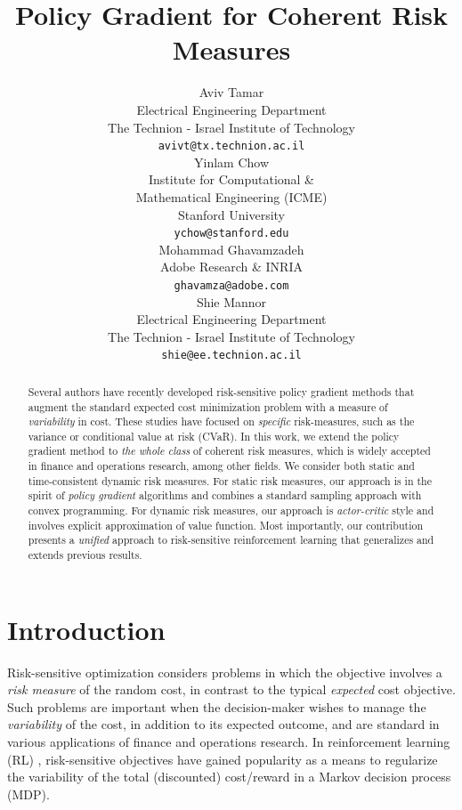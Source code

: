 \documentclass{article} %
\title{Policy Gradient for Coherent Risk Measures}
\author{
Aviv Tamar \\
Electrical Engineering Department\\
The Technion - Israel Institute of Technology\\
\texttt{avivt@tx.technion.ac.il} \\
\And
Yinlam Chow \\
Institute for Computational \& \\Mathematical Engineering (ICME) \\
Stanford University\\
\texttt{ychow@stanford.edu} \\
\And
Mohammad Ghavamzadeh \\
Adobe Research \& INRIA\\
\texttt{ghavamza@adobe.com} \\
\And
Shie Mannor \\
Electrical Engineering Department\\
The Technion - Israel Institute of Technology\\
\texttt{shie@ee.technion.ac.il} \\
}
\begin{document}
\maketitle

\begin{abstract}
Several authors have recently developed risk-sensitive policy gradient methods that augment the standard expected cost minimization problem with a measure of \emph{variability} in cost. These studies have focused on \emph{specific} risk-measures, such as the variance or conditional value at risk (CVaR). In this work, we extend the policy gradient method to \emph{the whole class} of coherent risk measures, which is widely accepted in finance and operations research, among other fields. We consider both static and time-consistent dynamic risk measures. For static risk measures, our approach is in the spirit of \emph{policy gradient} algorithms and combines a standard sampling approach with convex programming. For dynamic risk measures, our approach is \emph{actor-critic} style and involves explicit approximation of value function. Most importantly, our contribution presents a \emph{unified} approach to risk-sensitive reinforcement learning that generalizes and extends previous results.
\end{abstract}


\section{Introduction}
Risk-sensitive optimization considers problems in which the objective involves a \emph{risk measure} of the random cost, in contrast to the typical \emph{expected} cost objective. Such problems are important when the decision-maker wishes to manage the \emph{variability} of the cost, in addition to its expected outcome, and are standard in various applications of finance and operations research. In reinforcement learning (RL) \cite{sutton_reinforcement_1998}, risk-sensitive objectives have gained popularity as a means to regularize the variability of the total (discounted) cost/reward in a Markov decision process (MDP).
\end{document}
